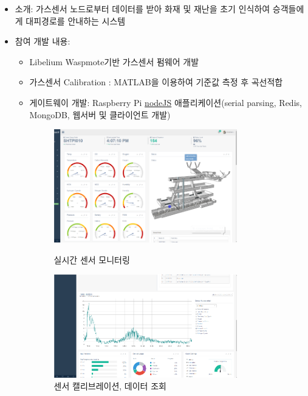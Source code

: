 \begin{itemize}[label=]
	\item 소개: 가스센서 노드로부터 데이터를 받아 화재 및 재난을 초기 인식하여 승객들에게 대피경로를 안내하는 시스템
	\item 참여 개발 내용:
	      \begin{itemize}[label=]
		      \item Libelium Waspmote기반 가스센서 펌웨어 개발
		      \item 가스센서 Calibration : MATLAB을 이용하여 기준값 측정 후 곡선적합
		      \item 게이트웨이 개발: Raspberry Pi \href{https://nodejs.org}{nodeJS} 애플리케이션(serial parsing, Redis, MongoDB, 웹서버 및 클라이언트 개발)

		            \begin{figure}[!ht]
			            \begin{fullwidth}
				            \centering
				            \parbox{0.8\textwidth}{
					            \includegraphics[width=0.8\textwidth]{images/m2m_01.png}
					            \caption*{실시간 센서 모니터링}
				            }\qquad
				            \parbox{0.8\textwidth}{
					            \includegraphics[width=0.8\textwidth]{images/m2m_02.png}
					            \caption*{센서 캘리브레이션, 데이터 조회}
				            }

\end{fullwidth}
\end{figure}
\end{itemize}
\end{itemize}
